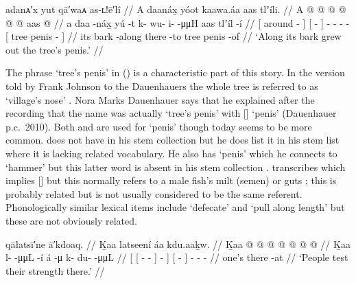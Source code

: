 \ex\label{ex:93-15-trees-penis}%
%
\begingl
	\glpreamble	adanᴀ′x yut qā′waᴀ as-ʟ!ē′łî  //
	\glpreamble	A daanáx̱ yóot kaawa.áa aas tlʼíli. //
	\gla	{} A  @ {} {}
		{}  @ {} {}
		 @ {} @ {} @ {} @ {}
		{} aas  @ {} {} //
	\glb	{} a daa -náx̱ {}
		{} yú -t {}
		k- wu- i-  -μμH
		{} aas tlʼíl -í {} //
	\glc	{}[  around - {}]
		{}[  - {}]
		- - -  -
		{}[ tree penis - {}] //
	\gld	{} its bark -along {}
		{} there -to {}
		 {} {} {} {} 
		{} tree penis -of {} //
	\glft	‘Along its bark grew out the tree’s penis.’
		//
\endgl
\xe

The phrase  ‘tree’s penis’ in (\lastx) is a characteristic part of this story.
In the version told by  Frank Johnson to the Dauenhauers the whole tree is referred to as  ‘village’s nose’ \parencite[142.96]{dauenhauer:1987}.
 Nora Marks Dauenhauer says that he explained after the recording that the name was actually  ‘tree’s penis’ with  [] ‘penis’ (Dauenhauer p.c.\ 2010).
Both  and  are used for ‘penis’ though today  seems to be more common.
\citeauthor{leer:1978b} does not have  in his stem collection \parencite{leer:1973} but he does list it in his stem list \parencite[29]{leer:1978b} where it is lacking related vocabulary.
He also has  ‘penis’ which he connects to  ‘hammer’ \parencite[35]{leer:1978b} but this latter word is absent in his stem collection \parencite{leer:1973}.
\citeauthor{swanton:1909} transcribes  which implies  [] but this normally refers to a male fish’s milt (semen) or guts \parencites[08/231]{leer:1973}[35]{leer:1978b}; this is probably related but is not usually considered to be the same referent.
Phonologically similar lexical items include  ‘defecate’ and  ‘pull along length’ but these are not obviously related.

\ex\label{ex:93-16-test-strength}%
%
\begingl
	\glpreamble	qāłatsī′ne ā′kdoaq. //
	\glpreamble	Ḵaa latseení áa kdu.aaḵw. //
	\gla	{} Ḵaa {}  @ {} @ {} @ {} {} {} {}
		{}  @ {} {}
		 @ {} @ {} @ {} //
	\glb	{} Ḵaa {} l-  -μμL {} {} -í {}
		{} á -μ {}
		k- du-  -μμL //
	\glc	{}[  {}[ -  - \· {}] - {}]
		{}[  - {}]
		- -  - //
	\gld	{} one’s {}  {} {} {} {} {} {}
		{} there -at {}
		 {} {} {} //
	\glft	‘People test their strength there.’
		//
\endgl
\xe

